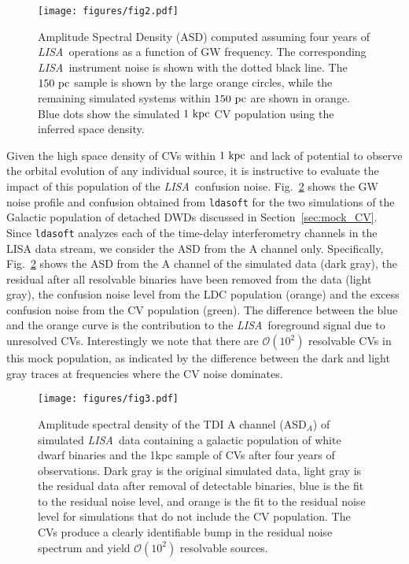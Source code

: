 \documentclass[fleqn,usenatbib]{mnras}
\newcommand{\lisa}{{\it LISA}}
\begin{document}
\begin{figure}
	\texttt{[image: figures/fig2.pdf]}
    \caption{Amplitude Spectral Density (ASD) computed assuming four years of \lisa\ operations as a function of GW frequency. The corresponding \lisa\ instrument noise is shown with the dotted black line. The $150~\rm{pc}$ \citet{pala20} sample is shown by the large orange circles, while the remaining simulated systems within $150~\rm{pc}$ are shown in orange. Blue dots show the simulated $1~\rm{kpc}$ CV population using the inferred \citet{pala20} space density.}
    \label{fig:asd}
\end{figure}


Given the high space density of CVs within $1~\rm{kpc}$ and lack of potential to observe the orbital evolution of any individual source, it is instructive to evaluate the impact of this population of the \lisa\ confusion noise. 
Fig.~\ref{fig:isd} shows the GW noise profile and confusion obtained from \texttt{ldasoft} \citep{ldasoft} for the two simulations of the Galactic population of detached DWDs discussed in Section~\ref{sec:mock_CV}. Since \texttt{ldasoft} analyzes each of the time-delay interferometry channels in the LISA data stream, we consider the ASD from the A channel only. Specifically, Fig.~\ref{fig:isd} shows the ASD from the A channel of the simulated data (dark gray), the residual after all resolvable binaries have been removed from the data (light gray), the confusion noise level from the LDC population (orange) and the excess confusion noise from the CV population (green). The difference between the blue and the orange curve is the contribution to the \lisa\ foreground signal due to unresolved CVs. Interestingly we note that there are $\mathcal{O}(10^2)$ resolvable CVs in this mock population, as indicated by the difference between the dark and light gray traces at frequencies where the CV noise dominates.

\begin{figure}
	\texttt{[image: figures/fig3.pdf]}
    \caption{Amplitude spectral density of the TDI A channel (ASD$_A$)  of simulated \lisa\ data containing a galactic population of white dwarf binaries and the 1kpc sample of CVs after four years of observations. Dark gray is the original simulated data, light gray is the residual data after removal of detectable binaries, blue is the fit to the residual noise level, and orange is the fit to the residual noise level for simulations that do not include the CV population. The CVs produce a clearly identifiable bump in the residual noise spectrum and yield $\mathcal{O}(10^2)$ resolvable sources.}
    \label{fig:isd}
\end{figure}
\end{document}

